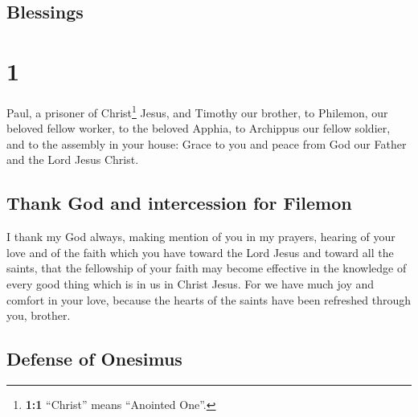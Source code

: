 \hypertarget{blessings}{%
\subsection{Blessings}\label{blessings}}

\hypertarget{section}{%
\section{1}\label{section}}

 Paul, a prisoner of Christ\footnote{\textbf{1:1}
  ``Christ'' means ``Anointed One''.} Jesus, and Timothy our brother, to
Philemon, our beloved fellow worker,  to the beloved
Apphia, to Archippus our fellow soldier, and to the assembly in your
house:  Grace to you and peace from God our Father and the
Lord Jesus Christ.

\hypertarget{thank-god-and-intercession-for-filemon}{%
\subsection{Thank God and intercession for
Filemon}\label{thank-god-and-intercession-for-filemon}}

 I thank my God always, making mention of you in my
prayers,  hearing of your love and of the faith which you
have toward the Lord Jesus and toward all the saints, 
that the fellowship of your faith may become effective in the knowledge
of every good thing which is in us in Christ Jesus.  For
we have much joy and comfort in your love, because the hearts of the
saints have been refreshed through you, brother.

\hypertarget{defense-of-onesimus}{%
\subsection{Defense of Onesimus}\label{defense-of-onesimus}}


